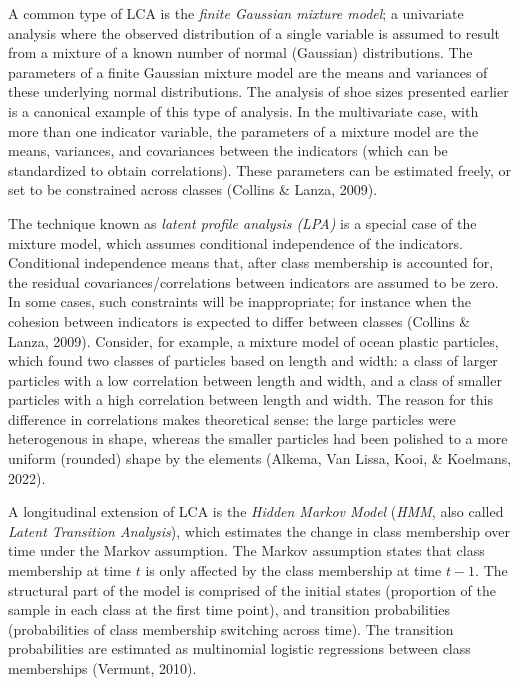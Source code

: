 \documentclass[
  ,man,floatsintext]{apa6}
\begin{document}
A common type of LCA is the \emph{finite Gaussian mixture model}; a
univariate analysis where the observed distribution of a single variable
is assumed to result from a mixture of a known number of normal
(Gaussian) distributions. The parameters of a finite Gaussian mixture
model are the means and variances of these underlying normal
distributions. The analysis of shoe sizes presented earlier is a
canonical example of this type of analysis. In the multivariate case,
with more than one indicator variable, the parameters of a mixture model
are the means, variances, and covariances between the indicators (which
can be standardized to obtain correlations). These parameters can be estimated
freely, or set to be constrained across classes (Collins \& Lanza, 2009).

The technique known as \emph{latent profile analysis (LPA)} is a special case
of the mixture model, which assumes conditional independence of the
indicators. Conditional independence means that, after class membership
is accounted for,
the residual covariances/correlations between indicators are
assumed to be zero.
In some cases, such constraints
will be inappropriate; for instance when the cohesion between indicators
is expected to differ between classes (Collins \& Lanza, 2009).
Consider, for example, a mixture model of ocean plastic particles, which found two classes of particles based on length and width:
a class of larger particles with a low correlation between length and width,
and a class of smaller particles with a high correlation between length and width.
The reason for this difference in correlations makes theoretical sense:
the large particles were heterogenous in shape,
whereas the smaller particles had been polished to a more uniform (rounded) shape by the elements (Alkema, Van Lissa, Kooi, \& Koelmans, 2022).

A longitudinal extension of LCA is the \emph{Hidden Markov Model} (\emph{HMM}, also
called \emph{Latent Transition Analysis}), which estimates the change in class
membership over time under the Markov assumption. The Markov
assumption states that class membership at time \(t\) is only affected
by the class membership at time \(t-1\). The structural part of the model
is comprised of the initial states (proportion of the sample in each
class at the first time point), and transition probabilities
(probabilities of class membership switching across time). The transition
probabilities are estimated as multinomial logistic regressions between
class memberships (Vermunt, 2010).
\end{document}
